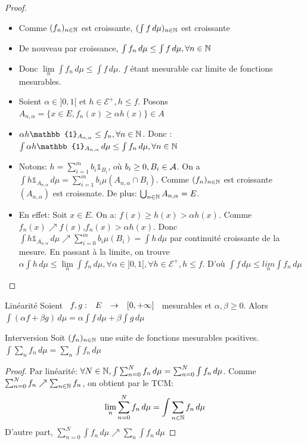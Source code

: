 \documentclass[]{report}
\begin{document}
    \begin{proof}{}{}
        \begin{itemize}
            \item Comme $(f_n)_{n\in\mathbb{N}}$ est croissante, $(\int f\,d\mu)_{n\in\mathbb{N}}$ est croissante
            \item De nouveau par croissance, $\int f_n\,d\mu\le\int f\,d\mu,\forall n\in \mathbb{N}$
            \item Donc $\underset{n}{\lim}\int f_n\,d\mu\le \int f\,d\mu$. $f$ étant mesurable car limite de fonctions mesurables.
            \item Soient $\alpha\in]0,1[$ et $h\in\mathcal{E}^+,h\le f$. Posons $A_{n,\alpha}=\{x\in E,f_n(x)\ge \alpha h(x)\}\in A$
            \item $\alpha h\mathbb{1}_{A_{n,\alpha}}\le f_n,\forall n\in\N$. Donc :$\int\alpha h\mathbb{1}_{A_{n,\alpha}}\,d\mu\le\int f_n\,d\mu,\forall n\in \N$
            \item Notons: $h=\sum_{i=1}^{m}b_i\mathbb{1}_{B_i}$, où $b_i\ge 0,B_i\in\mathcal{A}$. On a $\int h\mathbb{1}_{A_{n,\alpha}}\,d\mu=\sum_{i=1}^{m} b_i\mu(A_{n,\alpha}\cap B_i)$. Comme $(f_n)_{n\in\mathbb{N}}$ est croissante $(A_{n,\alpha})$ est croissnate. De plus: $\bigcup_{n\in\mathbb{N}}A_{n,\alpha}=E$.
            \item En effet: Soit $x\in E$. On a: $f(x)\ge h(x)>\alpha h(x)$. Comme $f_n(x)\nearrow f(x)$,\apcr $f_n(x)>\alpha h(x)$. Donc $\int h\mathbb{1}_{A_{n,\alpha}}\,d\mu\nearrow \sum_{i=0}^{m}b_i\mu(B_i)=\int h\,d\mu$ par continuité croissante de la mesure. En passant à la limite, on trouve $\alpha\int h\,d\mu\le \underset{n}{\lim}\int f_n\,d\mu,\forall \alpha\in]0,1[,\forall h\in \mathcal{E}^+,h\le f$. D'où $\int f\,d\mu\le \underset{n}{lim}\int f_n\,d\mu$
        \end{itemize}
    \end{proof}

    \begin{prop}{Linéarité}{}
        Soient $\begin{array}{ccccc} f,g : & E & \to & [0,+\infty] \end{array}$ mesurables et $\alpha,\beta\ge 0$. Alors $\int (\alpha f+\beta g)\,d\mu=\alpha\int f\,d\mu+\beta\int g\,d\mu$
    \end{prop}

    \begin{cor}{Interversion}{}
        Soit $(f_n)_{n\in\mathbb{N}}$ une suite de fonctions mesurables positives.$\int \sum_{n} f_n\,d\mu=\sum_n\int f_n\,d\mu$
    \end{cor}

    \begin{proof}{}{}
        Par linéarité: $\forall N\in\mathbb{N},\int\sum_{n=0}^{N}f_n\,d\mu=\sum_{n=0}^{N}\int f_n\,d\mu$. Comme $\sum_{n=0}^{N}f_n\nearrow\sum_{n\in\mathbb{N}} f_n$, on obtient par le TCM:\\
        \[\underset{n}{\lim}\sum_{n=0}^{N}f_n\,d\mu=\int\sum_{n\in\mathbb{N}} f_n\,d\mu\]
        D'autre part, $\sum_{n=0}^{N}\int f_n\,d\mu\nearrow \sum_{n}\int f_n\,d\mu$
    \end{proof}
\end{document}
